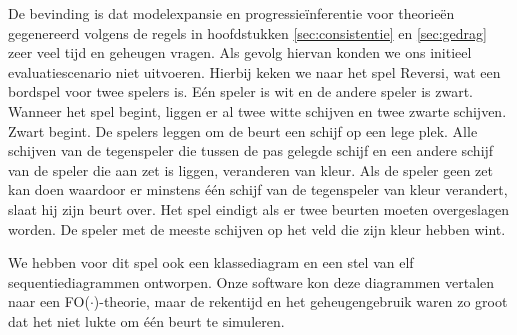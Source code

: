 De bevinding is dat modelexpansie en progressie\"inferentie voor theorie\"en gegenereerd volgens de regels in hoofdstukken \ref{sec:consistentie} en \ref{sec:gedrag} zeer veel tijd en geheugen vragen. Als gevolg hiervan konden we ons initieel evaluatiescenario niet uitvoeren. Hierbij keken we naar het spel Reversi, wat een bordspel voor twee spelers is. E\'en speler is wit en de andere speler is zwart. Wanneer het spel begint, liggen er al twee witte schijven en twee zwarte schijven. Zwart begint. De spelers leggen om de beurt een schijf op een lege plek. Alle schijven van de tegenspeler die tussen de pas gelegde schijf en een andere schijf van de speler die aan zet is liggen, veranderen van kleur. Als de speler geen zet kan doen waardoor er minstens \'e\'en schijf van de tegenspeler van kleur verandert, slaat hij zijn beurt over. Het spel eindigt als er twee beurten moeten overgeslagen worden. De speler met de meeste schijven op het veld die zijn kleur hebben wint.

We hebben voor dit spel ook een klassediagram en een stel van elf sequentiediagrammen ontworpen. Onze software kon deze diagrammen vertalen naar een FO($\cdot$)-theorie, maar de rekentijd en het geheugengebruik waren zo groot dat het niet lukte om \'e\'en beurt te simuleren.
